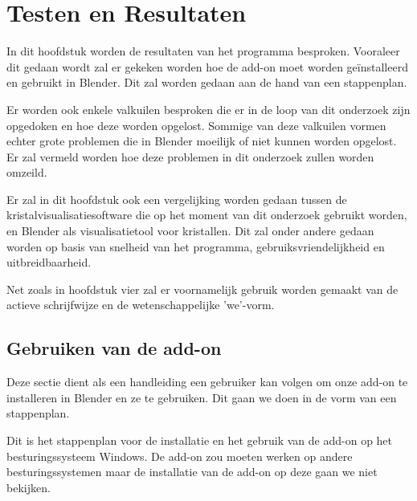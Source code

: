 

\chapter{Testen en Resultaten}  

In dit hoofdstuk worden de resultaten van het programma besproken. Vooraleer dit gedaan wordt zal er gekeken worden hoe de add-on moet worden geïnstalleerd en gebruikt in Blender. Dit zal worden gedaan aan de hand van een stappenplan.
\par
Er worden ook enkele valkuilen besproken die er in de loop van dit onderzoek zijn opgedoken en hoe deze worden opgelost. Sommige van deze valkuilen vormen echter grote problemen die in Blender moeilijk of niet kunnen worden opgelost. Er zal vermeld worden hoe deze problemen in dit onderzoek zullen worden omzeild.
\par
Er zal in dit hoofdstuk ook een vergelijking worden gedaan tussen de kristalvisualisatiesoftware die op het moment van dit onderzoek gebruikt worden, en Blender als visualisatietool voor kristallen. Dit zal onder andere gedaan worden op basis van snelheid van het programma, gebruiksvriendelijkheid en uitbreidbaarheid.
\par
Net zoals in hoofdstuk vier zal er voornamelijk gebruik worden gemaakt van de actieve schrijfwijze en de wetenschappelijke 'we'-vorm. 


\section{Gebruiken van de add-on}
Deze sectie dient als een handleiding een gebruiker kan volgen om onze add-on te installeren in Blender en ze te gebruiken. Dit gaan we doen in de vorm van een stappenplan. 
\par
Dit is het stappenplan voor de installatie en het gebruik van de add-on op het besturingssysteem Windows. De add-on zou moeten werken op andere besturingssystemen maar de installatie van de add-on op deze gaan we niet bekijken. 


